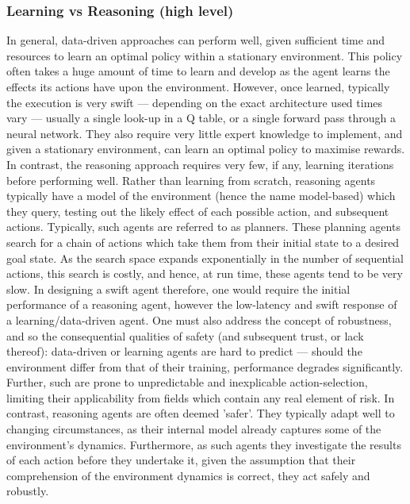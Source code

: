 \subsubsection{Learning vs Reasoning (high level)}
 
In general, data-driven approaches can perform well, given sufficient time and resources to learn an optimal policy within a stationary environment. This policy often takes a huge amount of time to learn and develop as the agent learns the effects its actions have upon the environment. However, once learned, typically the execution is very swift --- depending on the exact architecture used times vary --- usually a single look-up in a Q table, or a single forward pass through a neural network. They also require very little expert knowledge to implement, and given a stationary environment, can learn an optimal policy to maximise rewards. 
\newline \newline
In contrast, the reasoning approach requires very few, if any, learning iterations before performing well. Rather than learning from scratch, reasoning agents typically have a model of the environment (hence the name model-based) which they query, testing out the likely effect of each possible action, and subsequent actions. Typically, such agents are referred to as planners. These planning agents search for a chain of actions which take them from their initial state to a desired goal state. As the search space expands exponentially in the number of sequential actions, this search is costly, and hence, at run time, these agents tend to be very slow. 
\newline\newline
In designing a swift agent therefore, one would require the initial performance of a reasoning agent, however the low-latency and swift response of a learning/data-driven agent. 
\newline \newline
One must also address the concept of robustness, and so the consequential qualities of safety (and subsequent trust, or lack thereof): data-driven or learning agents are hard to predict --- should the environment differ from that of their training, performance degrades significantly. 
Further, such are prone to unpredictable and inexplicable action-selection, limiting their applicability from fields which contain any real element of risk. In contrast, reasoning agents are often deemed 'safer'. 
They typically adapt well to changing circumstances, as their internal model already captures some of the environment's dynamics. 
Furthermore, as such agents they investigate the results of each action before they undertake it, given the assumption that their comprehension of the environment dynamics is correct, they act safely and robustly.



